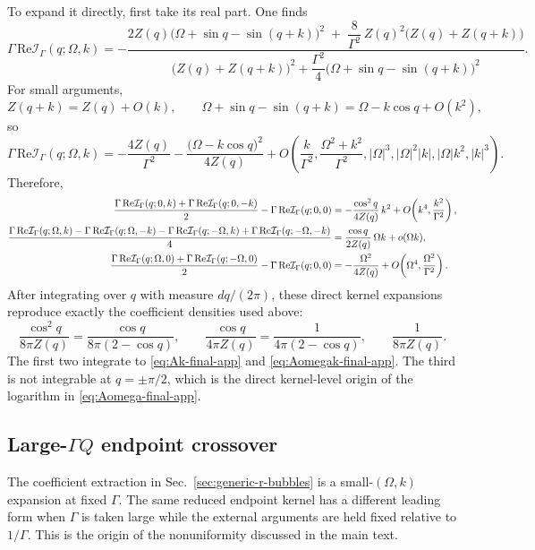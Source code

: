 \documentclass[aps,prx,preprint,amsmath,amssymb]{revtex4-2}
\renewcommand{\Re}{\text{Re}}
\begin{document}
To expand it directly, first take its real part.  One finds
\begin{equation}
\label{eq:Gmm-local-expansion-app}
\Gamma\,\Re \mathcal I_\Gamma(q;\Omega,k)
=
-\frac{
2 Z(q)\bigl(\Omega+\sin q-\sin(q+k)\bigr)^2
\;+\;
\dfrac{8}{\Gamma^2}\,Z(q)^2\bigl(Z(q)+Z(q+k)\bigr)}
{\bigl(Z(q)+Z(q+k)\bigr)^2+\dfrac{\Gamma^2}{4}\bigl(\Omega+\sin q-\sin(q+k)\bigr)^2}.
\end{equation}
For small arguments,
\[
Z(q+k)=Z(q)+O(k),
\qquad
\Omega+\sin q-\sin(q+k)=\Omega-k\cos q+O(k^2),
\]
so
\[
\Gamma\,\Re \mathcal I_\Gamma(q;\Omega,k)
=
-\frac{4Z(q)}{\Gamma^2}
-\frac{\bigl(\Omega-k\cos q\bigr)^2}{4Z(q)}
+ O\!\left(\frac{k}{\Gamma^2},\frac{\Omega^2+k^2}{\Gamma^2},
|\Omega|^3,|\Omega|^2|k|,|\Omega|k^2,|k|^3\right).
\]
Therefore,
\begin{align}
\frac{\Gamma\,\Re \mathcal I_\Gamma(q;0,k)+
\Gamma\,\Re \mathcal I_\Gamma(q;0,-k)}{2}
-\Gamma\,\Re \mathcal I_\Gamma(q;0,0)
&=
-\frac{\cos^2 q}{4Z(q)}\,k^2
+O\!\left(k^4,\frac{k^2}{\Gamma^2}\right),
\notag\\
\frac{
\Gamma\,\Re \mathcal I_\Gamma(q;\Omega,k)
-\Gamma\,\Re \mathcal I_\Gamma(q;\Omega,-k)
-\Gamma\,\Re \mathcal I_\Gamma(q;-\Omega,k)
+\Gamma\,\Re \mathcal I_\Gamma(q;-\Omega,-k)}{4}
&=
\frac{\cos q}{2Z(q)}\,\Omega k
+o(\Omega k),
\notag\\
\frac{\Gamma\,\Re \mathcal I_\Gamma(q;\Omega,0)+
\Gamma\,\Re \mathcal I_\Gamma(q;-\Omega,0)}{2}
-\Gamma\,\Re \mathcal I_\Gamma(q;0,0)
&=
-\frac{\Omega^2}{4Z(q)}
+O\!\left(\Omega^4,\frac{\Omega^2}{\Gamma^2}\right).
\label{eq:Gmm-local-densities-app}
\end{align}
After integrating over \(q\) with measure \(dq/(2\pi)\), these direct kernel
expansions reproduce exactly the coefficient densities used above:
\[
\frac{\cos^2 q}{8\pi Z(q)}
=
\frac{\cos q}{8\pi(2-\cos q)},
\qquad
\frac{\cos q}{4\pi Z(q)}
=
\frac{1}{4\pi(2-\cos q)},
\qquad
\frac{1}{8\pi Z(q)}.
\]
The first two integrate to \eqref{eq:Ak-final-app} and
\eqref{eq:Aomegak-final-app}.  The third is not integrable at
\(q=\pm\pi/2\), which is the direct kernel-level origin of the logarithm in
\eqref{eq:Aomega-final-app}.

\subsection{Large-\texorpdfstring{$\Gamma Q$}{Gamma Q} endpoint crossover}
\label{app:large-gamma-endpoint}

The coefficient extraction in Sec.~\ref{sec:generic-r-bubbles} is a
small-\((\Omega,k)\) expansion at fixed \(\Gamma\).  The same reduced endpoint
kernel has a different leading form when \(\Gamma\) is taken large while the
external arguments are held fixed relative to \(1/\Gamma\).  This is the origin
of the nonuniformity discussed in the main text.
\end{document}
